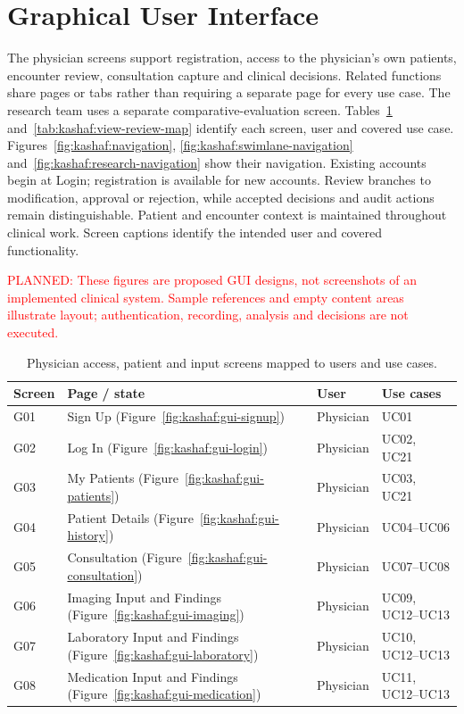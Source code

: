 \clearpage
\section{Graphical User Interface}
The physician screens support registration, access to the physician's own patients, encounter review, consultation capture and clinical decisions. Related functions share pages or tabs rather than requiring a separate page for every use case. The research team uses a separate comparative-evaluation screen. Tables~\ref{tab:kashaf:view-map} and~\ref{tab:kashaf:view-review-map} identify each screen, user and covered use case. Figures~\ref{fig:kashaf:navigation}, \ref{fig:kashaf:swimlane-navigation} and~\ref{fig:kashaf:research-navigation} show their navigation. Existing accounts begin at Login; registration is available for new accounts. Review branches to modification, approval or rejection, while accepted decisions and audit actions remain distinguishable. Patient and encounter context is maintained throughout clinical work. Screen captions identify the intended user and covered functionality.

\textcolor{red}{PLANNED: These figures are proposed GUI designs, not screenshots of an implemented clinical system. Sample references and empty content areas illustrate layout; authentication, recording, analysis and decisions are not executed.}

\begin{table}[htbp]
\centering
\small
\caption{Physician access, patient and input screens mapped to users and use cases.}
\label{tab:kashaf:view-map}
\begin{tabular}{|p{}|p{}|p{}|p{}|}
\hline
Screen & Page / state & User & Use cases \\ \hline
G01 & Sign Up (Figure~\ref{fig:kashaf:gui-signup}) & Physician & UC01 \\ \hline
G02 & Log In (Figure~\ref{fig:kashaf:gui-login}) & Physician & UC02, UC21 \\ \hline
G03 & My Patients (Figure~\ref{fig:kashaf:gui-patients}) & Physician & UC03, UC21 \\ \hline
G04 & Patient Details (Figure~\ref{fig:kashaf:gui-history}) & Physician & UC04--UC06 \\ \hline
G05 & Consultation (Figure~\ref{fig:kashaf:gui-consultation}) & Physician & UC07--UC08 \\ \hline
G06 & Imaging Input and Findings (Figure~\ref{fig:kashaf:gui-imaging}) & Physician & UC09, UC12--UC13 \\ \hline
G07 & Laboratory Input and Findings (Figure~\ref{fig:kashaf:gui-laboratory}) & Physician & UC10, UC12--UC13 \\ \hline
G08 & Medication Input and Findings (Figure~\ref{fig:kashaf:gui-medication}) & Physician & UC11, UC12--UC13 \\ \hline
\end{tabular}
\end{table}

